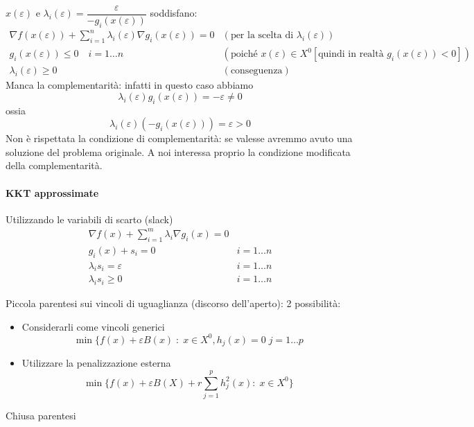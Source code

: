  $x(\varepsilon)$ e $\lambda_i(\varepsilon) =  \dfrac{\varepsilon}{-g_i(x(\varepsilon))}$
soddisfano:
$$ 
\begin{array}{ll}
\nabla f(x(\varepsilon)) + \displaystyle \sum_{i=1}^{n}
\lambda_i(\varepsilon) \nabla g_i(x(\varepsilon)) = 0
& (\text{per la scelta di }\lambda_i(\varepsilon)) \\
 g_i(x(\varepsilon)) \leq 0 \quad i=1\ldots n  &
( \text{poich\'e } x(\varepsilon) \in X^{0} [\text{quindi in realt\`a } g_i(x(\varepsilon))<0 ]) \\
 \lambda_i(\varepsilon) \geq 0   &  (\text{conseguenza})
\end{array}
$$
Manca la complementarit\`a: infatti in questo caso abbiamo
$$ \lambda_i(\varepsilon) g_i(x(\varepsilon)) = - \varepsilon \neq 0 $$
ossia
$$ \lambda_i(\varepsilon)(-g_i(x(\varepsilon))) = \varepsilon > 0$$
Non \`e  rispettata la condizione di complementarit\`a: se valesse
avremmo avuto una soluzione del problema originale.
A noi interessa proprio la condizione modificata della complementarit\`a.
\paragraph{KKT approssimate}
Utilizzando le variabili di scarto (slack)
 $$
\begin{array}{ll}
\nabla f(x) + \displaystyle \sum_{i=1}^{m} \lambda_i \nabla g_i(x) = 0  & \\
 g_i(x) + s_i = 0  &    i=1 \ldots n \\
 \lambda_i s_i = \varepsilon &  i =1 \ldots n \\
  \lambda_i s_i \geq 0 \quad &  i= 1 \ldots n
\end{array}
$$

\begin{observation}
Piccola parentesi sui vincoli di uguaglianza (discorso dell'aperto):
2 possibilit\`a:
\begin{itemize}
\item Considerarli come vincoli generici
  $$ \min \{ f(x) + \varepsilon B(x) \; : \; x \in X^{0}, h_j(x) = 0 \;
  j =  1 \ldots p$$
\item Utilizzare la penalizzazione esterna
  $$ \min \{ f(x) + \varepsilon B(X) + r \displaystyle \sum_{j=1}^{p} h_j^{2}(x)
  : \; x \in X^{0} \}$$
\end{itemize}
Chiusa parentesi
\end{observation}

